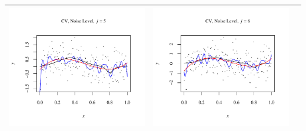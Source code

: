 \documentclass[11pt]{article}
\begin{document}
\begin{table}[h]
\begin{center}
\begin{tabular}{| >{\centering\arraybackslash}m{2.1in} |  >{\centering\arraybackslash}m{2.1in} |  >{\centering\arraybackslash}m{2.1in}|}
      \includegraphics[width=1\linewidth,height=0.18\textheight]{Graphs/1/1/assignment5_a_1_1_5}&
      \includegraphics[width=1\linewidth,height=0.18\textheight]{Graphs/1/1/assignment5_a_1_1_6}\\\hline
    \end{tabular}
  \end{center}
\end{table}
\end{document}
